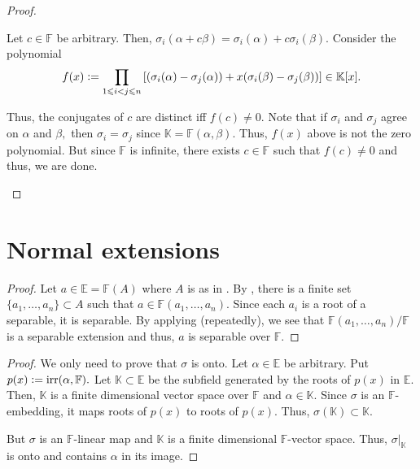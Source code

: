 \begin{proof}
\begin{enumerate}[leftmargin=*]
        Let $c \in \mathbb{F}$ be arbitrary. Then, $\sigma_i(\alpha + c\beta) = \sigma_i(\alpha) + c\sigma_i(\beta).$ Consider the polynomial
        \begin{equation*} 
            f(x) \vcentcolon= \prod_{1 \le i < j \le n}\left[(\sigma_i(\alpha) - \sigma_j(\alpha)) + x(\sigma_i(\beta) - \sigma_j(\beta))\right] \in \mathbb{K}[x].
        \end{equation*}

        Thus, the conjugates of $c$ are distinct iff $f(c) \neq 0.$ Note that if $\sigma_i$ and $\sigma_j$ agree on $\alpha$ and $\beta,$ then $\sigma_i = \sigma_j$ since $\mathbb{K} = \mathbb{F}(\alpha, \beta).$ Thus, $f(x)$ above is not the zero polynomial. But since $\mathbb{F}$ is infinite, there exists $c \in \mathbb{F}$ such that $f(c) \neq 0$ and thus, we are done. \qedhere
    \end{enumerate}
\end{proof}

\section{Normal extensions}

\seppolysplittingfields*\label{prop:seppolysplittingfields2}
\begin{flushright}\hyperref[prop:seppolysplittingfields]{\upsym}\end{flushright}
\begin{proof}
    Let $a \in \mathbb{E} = \mathbb{F}(A)$ where $A$ is as in . By , there is a finite set $\{a_1, \ldots, a_n\} \subset A$ such that $a \in \mathbb{F}(a_1, \ldots, a_n).$ Since each $a_i$ is a root of a separable, it is separable. By applying  (repeatedly), we see that $\mathbb{F}(a_1, \ldots, a_n)/\mathbb{F}$ is a separable extension and thus, $a$ is separable over $\mathbb{F}.$
\end{proof}

\algebraicautomorphism*\label{lem:algebraicautomorphism2}
\begin{flushright}\hyperref[lem:algebraicautomorphism]{\upsym}\end{flushright}
\begin{proof}
    We only need to prove that $\sigma$ is onto. Let $\alpha \in \mathbb{E}$ be arbitrary. Put $p(x) \vcentcolon= \irr(\alpha, \mathbb{F}).$ Let $\mathbb{K} \subset \mathbb{E}$ be the subfield generated by the roots of $p(x)$ in $\mathbb{E}.$ Then, $\mathbb{K}$ is a finite dimensional vector space over $\mathbb{F}$ and $\alpha \in \mathbb{K}.$ Since $\sigma$ is an $\mathbb{F}$-embedding, it maps roots of $p(x)$ to roots of $p(x).$ Thus, $\sigma(\mathbb{K}) \subset \mathbb{K}.$

    But $\sigma$ is an $\mathbb{F}$-linear map and $\mathbb{K}$ is a finite dimensional $\mathbb{F}$-vector space. Thus, $\sigma|_{\mathbb{K}}$ is onto and contains $\alpha$ in its image.
\end{proof}

